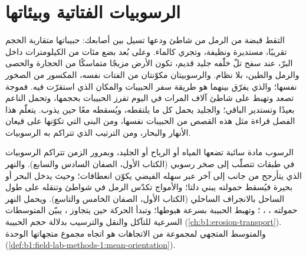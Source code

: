 \chapter{الرسوبيات الفتاتية وبيئاتها}\label{ch:b1:clastic-sediments}

التقط قبضة من الرمل من شاطئ ودعها تسيل بين أصابعك: حبيباتها متقاربة الحجم تقريبًا، مستديرة ونظيفة، وتجري كالماء. وعلى بُعد بضع مئات من الكيلومترات داخل البرّ، عند سفح تلّ خلّفه جليد قديم، تكون الأرض مزيجًا متماسكًا من الحجارة والحصى والرمل والطين، بلا نظام. والرسوبيتان مكوّنتان من الفتات نفسه، المكسور من الصخور نفسها؛ والذي يفرّق بينهما هو طريقة سفر الحبيبات والمكان الذي استقرّت فيه. فموجة تصعد وتهبط على شاطئ آلاف المرات في اليوم تفرز الحبيبات بحجمها، وتحمل الناعم بعيدًا وتستدير الباقي؛ والجليد يحمل كل ما يلتقطه، ويُسقطه معًا حين يذوب. يتعلّم هذا الفصل قراءة مثل هذه القصص من الحبيبات نفسها، ومن البنى التي تكوّنها على قيعان الأنهار والبحار، ومن الترتيب الذي تتراكم به الرسوبيات.

\begin{recall}
الرسوب مادة سائبة تضعها المياه أو الرياح أو الجليد، وبمرور الزمن تتراكم الرسوبيات في طبقات تتصلّب إلى صخر رسوبي (الكتاب الأول، الصفان السادس والسابع). والنهر الذي يتأرجح من جانب إلى آخر عبر سهله الفيضي يكوّن انعطافات؛ وحيث يدخل البحر أو بحيرة فيُسقط حمولته يبني دلتا؛ والأمواج تكدّس الرمل في شواطئ وتنقله على طول الساحل بالانجراف الساحلي (الكتاب الأول، الصفان الخامس والتاسع). ويحمل النهر حمولته ، ، ؛ وتهبط الحبيبة بسرعة هبوطها؛ وتبدأ الحركة حين يتجاوز  ،  يبيّن المتوسطات السرعية للتآكل والنقل والترسيب بدلالة حجم الحبيبة (\cref{ch:b1:erosion-transport}). والمتوسط المتجهي لمجموعة من الاتجاهات هو اتجاه مجموع متجهاتها الوحدة (\cref{def:b1:field-lab-methods-1:mean-orientation}).
\end{recall}

